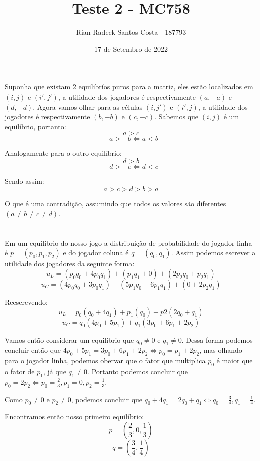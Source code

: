 \documentclass[12pt, letterpaper]{article}
\title{Teste 2 - MC758}
\author{Rian Radeck Santos Costa - 187793}
\date{17 de Setembro de 2022}
\begin{document}
\maketitle
\newpage

\section{}
	Suponha que existam 2 equilibríos puros para a matriz, eles estão localizados em $(i, j)$ e $(i', j')$, a utilidade dos jogadores é respectivamente $(a, -a)$ e $(d, -d)$. Agora vamos olhar para as células $(i, j')$ e $(i', j)$, a utilidade dos jogadores é respectivamente $(b, -b)$ e $(c, -c)$. Sabemos que $(i, j)$ é um equilíbrio, portanto:
	$$
	a > c
	$$$$
	-a > -b \Leftrightarrow a < b
	$$
	
	Analogamente para o outro equilíbrio:
	$$
	d > b
	$$$$
	-d > -c \Leftrightarrow d < c
	$$

	Sendo assim:
	$$
	a > c > d > b > a
	$$

	O que é uma contradição, assumindo que todos os valores são diferentes $(a \neq b \neq c \neq d)$.

\section{}
	Em um equilíbrio do nosso jogo a distribuição de probabilidade do jogador linha é $p = (p_0, p_1, p_2)$ e do jogador coluna é $q = (q_0, q_1)$. Assim podemos escrever a utilidade dos jogadores da seguinte forma:
	$$
	u_L = (p_0q_0 + 4p_0q_1) + (p_1q_1 + 0) + (2p_2q_0 + p_2q_1)
	$$$$
	u_C =  (4p_0q_0 + 3p_0q_1) + (5p_1q_0 + 6p_1q_1) + (0 + 2p_2q_1)
	$$

	Reescrevendo:
	$$
	u_L = p_0(q_0 + 4q_1) + p_1(q_0) + p2(2q_0 + q_1)
	$$$$
	u_C = q_0(4p_0 + 5p_1) + q_1(3p_0 + 6p_1 + 2p_2)
	$$

	Vamos então considerar um equilíbrio que $q_0 \neq 0$ e $q_1 \neq 0$. Dessa forma podemos concluir então que $4p_0 + 5p_1 = 3p_0 + 6p_1 + 2p_2 \Leftrightarrow p_0 = p_1 + 2p_2$, mas olhando para o jogador linha, podemos obervar que o fator que multiplica $p_0$ é maior que o fator de $p_1$, já que $q_1 \neq 0$. Portanto podemos concluir que $p_0 = 2p_2 \Leftrightarrow p_0 = \frac{2}{3}, p_1 = 0, p_2 = \frac{1}{3}$. 

	Como $p_0 \neq 0$ e $p_2 \neq 0$, podemos concluir que $q_0 + 4q_1 = 2q_0 + q_1 \Leftrightarrow q_0 = \frac{3}{4}, q_1 = \frac{1}{4}$.

	Encontramos então nosso primeiro equilíbrio:
	$$
	p = \left(\frac{2}{3}, 0, \frac{1}{3} \right)
	$$$$
	q = \left(\frac{3}{4}, \frac{1}{4} \right)
	$$
\end{document}
